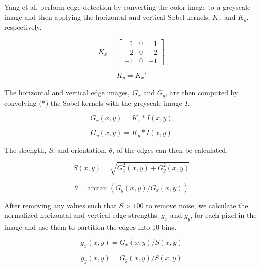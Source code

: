 \documentclass[11pt]{article}
\begin{document}
Yang et al. \cite{hybrid} perform edge detection by converting the color image to a greyscale image and then applying the horizontal and vertical Sobel kernels, $K_x$ and $K_y$, respectively.

\begin{equation}
K_x = \left [ \begin{array}{ccc}
+1 & 0 & -1 \\
+2 & 0 & -2 \\
+1 & 0 & -1 \end{array} \right ] 
\label{eq:horzsobel}
\end{equation}

\begin{equation}
K_y = K_x'
\label{eq:vertsobel}
\end{equation}

The horizontal and vertical edge images, $G_x$ and $G_y$, are then computed by convolving ($*$) the Sobel kernels with the greyscale image $I$.

\begin{equation}
G_x(x,y) = K_x * I(x,y)
\label{eq:horzedgeimg}
\end{equation}

\begin{equation}
G_y(x,y) = K_y * I(x,y)
\label{eq:vertedgeimg}
\end{equation}

The strength, $S$, and orientation, $\theta$, of the edges can then be calculated.

\begin{equation}
S(x,y) = \sqrt{G_x^2(x,y) + G_y^2(x,y)}
\label{eq:edgestrength}
\end{equation}

\begin{equation}
\theta = \text{arctan } (G_y(x,y) / G_x(x,y))
\label{eq:edgeorient}
\end{equation}

After removing any values such that $S > 100$  to remove noise, we calculate the normalized horizontal and vertical edge strengths, $g_x$ and $g_y$, for each pixel in the image and use them to partition the edges into 10 bins.

\begin{equation}
g_x(x,y) = G_x(x,y)/S(x,y)
\label{eq:horznormedgestrength}
\end{equation}

\begin{equation}
g_y(x,y) = G_y(x,y)/S(x,y)
\label{eq:vertnormedgestrength}
\end{equation}
\end{document}
